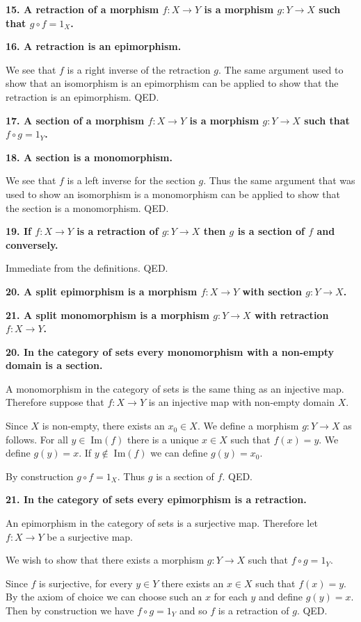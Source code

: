 \documentclass[12pt]{article}
\begin{document}
\textbf{15. A retraction of a morphism $f : X \to Y$ is a morphism $g : Y \to X$ such that $g\circ f = 1_X$.}

\textbf{16. A retraction is an epimorphism.}

We see that $f$ is a right inverse of the retraction $g$. The same argument used to show that an isomorphism is an epimorphism can be applied to show that the retraction is an epimorphism. QED.

\textbf{17. A section of a morphism $f : X \to Y$ is a morphism $g : Y \to X$ such that $f\circ g = 1_Y$.}

\textbf{18. A section is a monomorphism.}

We see that $f$ is a left inverse for the section $g$. Thus the same argument that was used to show an isomorphism is a monomorphism can be applied to show that the section is a monomorphism. QED.

\textbf{19. If $f : X \to Y$ is a retraction of $g : Y \to X$ then $g$ is a section of $f$ and conversely.}

Immediate from the definitions. QED.

\textbf{20. A split epimorphism is a morphism $f : X \to Y$ with section $g : Y \to X$.}

\textbf{21. A split monomorphism is a morphism $g : Y \to X$ with retraction $f : X \to Y$.}

\textbf{20. In the category of sets every monomorphism with a non-empty domain is a section.}

A monomorphism in the category of sets is the same thing as an injective map. Therefore suppose that $f : X \to Y$ is an injective map with non-empty domain $X$.

Since $X$ is non-empty, there exists an $x_0 \in X$. We define a morphism $g : Y \to X$ as follows. For all $y \in \;\mbox{Im}(f)$ there is a unique $x \in X$ such that $f(x) = y$. We define $g(y) = x$. If $y \notin \;\mbox{Im}(f)$ we can define $g(y) = x_0$.

By construction $g\circ f = 1_X$. Thus $g$ is a section of $f$. QED.

\textbf{21. In the category of sets every epimorphism is a retraction.}

An epimorphism in the category of sets is a surjective map. Therefore let $f : X \to Y$ be a surjective map.

We wish to show that there exists a morphism $g : Y \to X$ such that $f\circ g = 1_Y$.

Since $f$ is surjective, for every $y \in Y$ there exists an $x \in X$ such that $f(x) = y$. By the axiom of choice we can choose such an $x$ for each $y$ and define $g(y) = x$. Then by construction we have $f\circ g = 1_Y$ and so $f$ is a retraction of $g$. QED.
\end{document}
